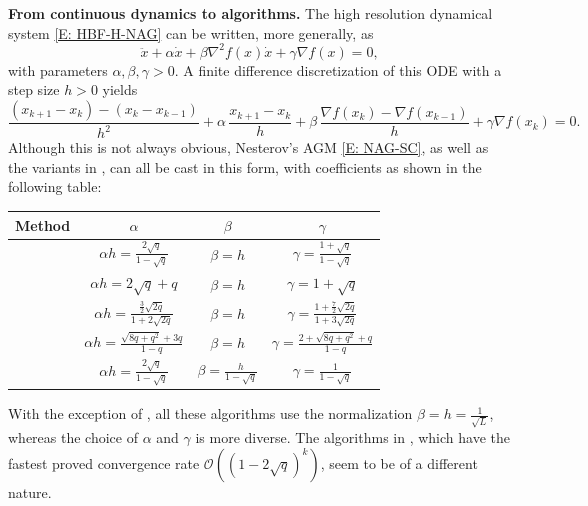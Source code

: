 \documentclass[pdflatex,sn-mathphys-num]{sn-jnl}
\theoremstyle{thmstyleone}
\theoremstyle{thmstyletwo}
\theoremstyle{thmstylethree}
\begin{document}
{\bf From continuous dynamics to algorithms.} The high resolution dynamical system \eqref{E: HBF-H-NAG} can be written, more generally, as
\begin{equation}\label{System: HBF-H}\tag{HBF-H}
\ddot{x} + \alpha\dot{x} + \beta\nabla^2 f(x) \dot{x} + \gamma \nabla f(x) = 0,
\end{equation}
with parameters $\alpha,\beta,\gamma > 0$. A finite difference discretization of this ODE with a step size $h>0$ yields
\begin{equation} \label{E:Algorithm_family}
\frac{(x_{k+1}-x_k)-(x_k-x_{k-1})}{h^2} + \alpha\, \frac{x_{k+1}-x_k}{h} + \beta\,\frac{\nabla f(x_k) - \nabla f(x_{k-1})}{h} + \gamma \nabla f(x_k) = 0.
\end{equation}
Although this is not always obvious, Nesterov's AGM \eqref{E: NAG-SC}, as well as the variants in \cite{Siegel_2019,Attouch_2022,Aujol_2022,Park_2023}, can all be cast in this form, with coefficients as shown in the following table:

\begin{center}
\renewcommand{\arraystretch}{1.8}
\begin{tabular}{|c|c|c|c|}
\hline
{\bf Method} & $\alpha$ & $\beta$ & $\gamma$  
 \\
\hline
 {\cite{Nesterov_2004}}  
 & $\alpha h = \frac{2\sqrt{q}}{1-\sqrt{q}}$ & $\beta=h$ & $\gamma = \frac{1+\sqrt{q}}{1-\sqrt{q}}$\\
\hline
 {\cite{Siegel_2019}}  
 & $\alpha h = 2\sqrt{q} + q$ & $\beta=h$ & $\gamma = 1 + \sqrt{q}$ \\
\hline
 {\cite{Aujol_2022}}  
 & $\alpha h = \frac{\frac{3}{2}\sqrt{2q}}{1+2\sqrt{2q}}$ & $\beta=h$ &  $\gamma = \frac{1 + \frac{7}{2}\sqrt{2q}}{1+3\sqrt{2q}}$ \\
\hline
 {\cite{Park_2023}}  
 & $\alpha h = \frac{\sqrt{8q + q^2} + 3q }{1-q}$ & $\beta=h$ &  $\gamma = \frac{ 2 + \sqrt{8q + q^2} + q }{1-q}$ \\
\hline 
 {\cite{Attouch_2022}}    
 & $\alpha h = \frac{2\sqrt{q}}{1-\sqrt{q}}$ & $\beta=\frac{h}{1-\sqrt{q}}$ & $\gamma = \frac{1}{1-\sqrt{q}}$ \\
 \hline
\end{tabular}
\end{center}
With the exception of \cite{Attouch_2022}, all these algorithms use the normalization $\beta=h=\frac{1}{\sqrt{L}}$, whereas the choice of $\alpha$ and $\gamma$ is more diverse. The algorithms in \cite{Scoy_2018,Taylor_2023_optimal}, which have the fastest proved convergence rate $\mathcal{O}\left( (1-2\sqrt{q})^{k} \right)$, seem to be of a different nature. \\
\end{document}
